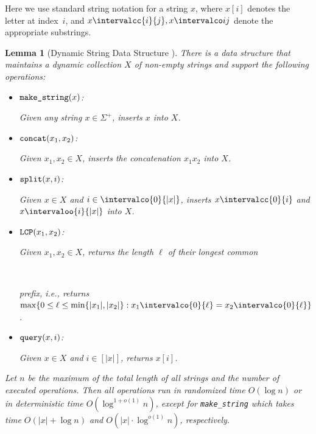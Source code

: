 \documentclass[10pt,a4paper]{article}
\newtheorem{lemma}{Lemma}[section]
\newcommand{\W}{X}
\DeclarePairedDelimiter\set{\lbrace}{\rbrace}
\newcommand\Oo{O}
\newcommand{\Op}[1]{{\normalfont\texttt{#1}}}
\begin{document}
Here we use standard string notation for a string $x$, where $x[i]$ denotes the letter at index~$i$, and $x\intervalcc{i}{j}, x \intervalco ij$ denote the appropriate substrings.

\begin{lemma}[Dynamic String Data Structure \cite{GawrychowskiKKL18,KempaK22}]
    \label{lem:dynamic_string_ds}
    There is a data structure that maintains a dynamic collection $\W$ of non-empty strings and support the following operations:
    \smallskip
    \begin{itemize}
        \item \parbox{3.75cm}{$\Op{make\_string}(x)$:} Given any string $x \in \Sigma^+$, inserts $x$ into $X$.

        \item \parbox{3.75cm}{$\Op{concat}(x_1,x_2)$:} Given $x_1, x_2 \in X$, inserts the concatenation $x_1 x_2$ into $\W$.

        \item \parbox{3.75cm}{$\Op{split}(x,i)$:} Given $x \in X$ and $i \in \intervalco{0}{|x|}$, inserts $x\intervalcc{0}{i}$ and $x\intervaloo{i}{|x|}$ into $X$.

        \item \parbox{3.75cm}{$\Op{LCP}(x_1,x_2)$:} Given $x_1, x_2 \in X$, returns the length $\ell$ of their longest common \\\parbox{3.75cm}{~} prefix, i.e., returns $\max\set{0 \le \ell \leq \min\set{|x_1|, |x_2|} : x_1\intervalco{0}{\ell} = x_2\intervalco{0}{\ell}}$.

        \item \parbox{3.75cm}{$\Op{query}(x,i)$:} Given $x \in X$ and $i \in [|x|]$, returns $x[i]$.
    \end{itemize}
    \smallskip
    Let $n$ be the maximum of the total length of all strings and the number of executed operations. 
    Then all operations run in randomized time $\Oo(\log n)$ or in deterministic time $\Oo(\log^{1 + o(1)}n)$, except for \Op{make\_string} which takes time $\Oo(|x| + \log n)$ and $\Oo(|x| \cdot \log^{o(1)}n)$, respectively.
\end{lemma}
\end{document}
